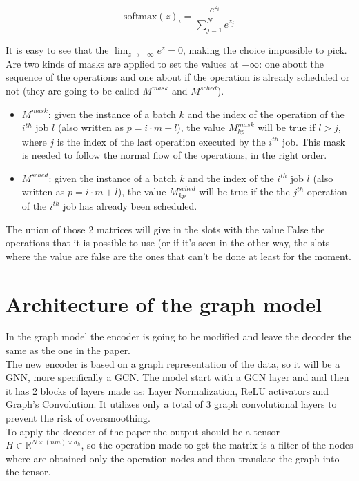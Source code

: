 \documentclass[12pt]{book}
\begin{document}
\[\mathrm{softmax}(z)_i = \frac{e^{z_i}}{\sum_{j=1}^N e^{z_j}}\]

It is easy to see that the $\lim_{z\rightarrow -\infty}e^z=0$, making the choice impossible to pick.\\
Are two kinds of masks are applied to set the values at $-\infty$: one about the sequence of the operations and one about if the operation is already scheduled or not (they are going to be called $M^{mask}$ and $M^{sched}$).
\begin{itemize}
    \item $M^{mask}$: given the instance of a batch $k$ and the index of the operation of the $i^{th}$ job $l$ (also written as $p=i\cdot m + l$), the value $M^{mask}_{kp}$ will be true if $l>j$, where $j$ is the index of the last operation executed by the $i^{th}$ job. This mask is needed to follow the normal flow of the operations, in the right order.
    \item $M^{sched}$: given the instance of a batch $k$ and the index of the $i^{th}$ job $l$ (also written as $p=i\cdot m + l$), the value $M^{sched}_{kp}$ will be true if the the $j^{th}$ operation of the $i^{th}$ job has already been scheduled.
\end{itemize}

The union of those 2 matrices will give in the slots with the value False the operations that it is possible to use (or if it's seen in the other way, the slots where the value are false are the ones that can't be done at least for the moment.

\section{Architecture of the graph model}
In the graph model the encoder is going to be modified and leave the decoder the same as the one in the paper.\\
The new encoder is based on a graph representation of the data, so it will be a GNN, more specifically a GCN. The model start with a GCN layer and and then it has 2 blocks of layers made as: Layer Normalization, ReLU activators and  Graph's Convolution. It utilizes only a total of 3 graph convolutional layers to prevent the risk of oversmoothing.\\
To apply the decoder of the paper the output should be a tensor $H\in\mathbb{R}^{N\times(nm)\times d_h}$, so the operation made to get the matrix is a filter of the nodes where are obtained only the operation nodes and then translate the graph into the tensor. 
\end{document}
